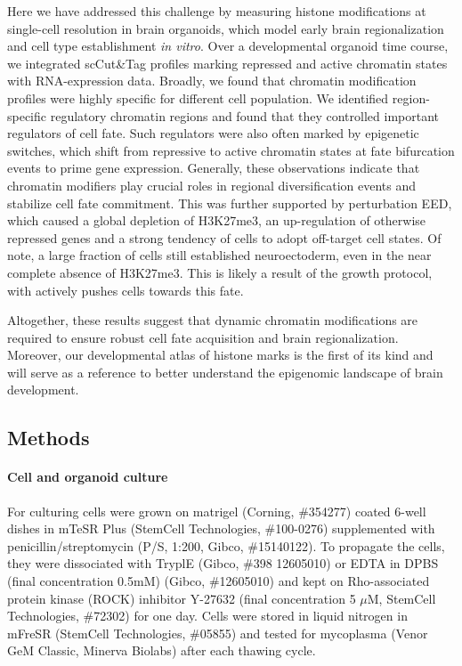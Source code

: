 Here we have addressed this challenge by measuring histone modifications at single-cell resolution in brain organoids, which model early brain regionalization and cell type establishment \textit{in vitro}. Over a developmental organoid time course, we integrated scCut\&Tag profiles marking repressed and active chromatin states with RNA-expression data. Broadly, we found that chromatin modification profiles were highly specific for different cell population. We identified region-specific regulatory chromatin regions and found that they controlled important regulators of cell fate. Such regulators were also often marked by epigenetic switches, which shift from repressive to active chromatin states at fate bifurcation events to prime gene expression. Generally, these observations indicate that chromatin modifiers play crucial roles in regional diversification events and stabilize cell fate commitment. This was further supported by perturbation EED, which caused a global depletion of H3K27me3, an up-regulation of otherwise repressed genes and a strong tendency of cells to adopt off-target cell states. Of note, a large fraction of cells still established neuroectoderm, even in the near complete absence of H3K27me3. This is likely a result of the growth protocol, with actively pushes cells towards this fate. 

Altogether, these results suggest that dynamic chromatin modifications are required to ensure robust cell fate acquisition and brain regionalization. Moreover, our developmental atlas of histone marks is the first of its kind and will serve as a reference to better understand the epigenomic landscape of brain development.




\subsection{Methods}

\paragraph{Cell and organoid culture}
For culturing cells were grown on matrigel (Corning, \#354277) coated 6-well dishes in mTeSR Plus (StemCell Technologies, \#100-0276) supplemented with penicillin/streptomycin (P/S, 1:200, Gibco, \#15140122). To propagate the cells, they were dissociated with TryplE (Gibco, \#398 12605010) or EDTA in DPBS (final concentration 0.5mM) (Gibco, \#12605010) and kept on Rho-associated protein kinase (ROCK) inhibitor Y-27632 (final concentration 5 $\mu$M, StemCell Technologies, \#72302) for one day. Cells were stored in liquid nitrogen in mFreSR (StemCell Technologies, \#05855) and tested for mycoplasma (Venor GeM Classic, Minerva Biolabs) after each thawing cycle. 

